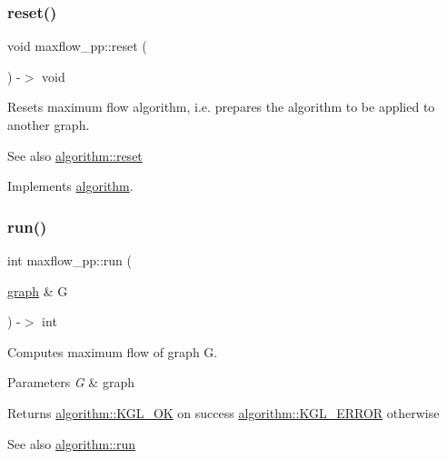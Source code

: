 \subsubsection{\texorpdfstring{reset()}{reset()}}
{\footnotesize\ttfamily void maxflow\+\_\+pp\+::reset (\begin{DoxyParamCaption}{ }\end{DoxyParamCaption}) -\/$>$ void\hspace{0.3cm}{\ttfamily [virtual]}}

Resets maximum flow algorithm, i.\+e. prepares the algorithm to be applied to another graph. \begin{DoxySeeAlso}{See also}
\mbox{\hyperlink{classalgorithm_aea645f2e39976a477c8f8564656fd1b6}{algorithm\+::reset}} 
\end{DoxySeeAlso}


Implements \mbox{\hyperlink{classalgorithm_aea645f2e39976a477c8f8564656fd1b6}{algorithm}}.

\mbox{\label{classmaxflow__pp_a6c6fa792d7f0441048361778697e8e1e}} 
\subsubsection{\texorpdfstring{run()}{run()}}
{\footnotesize\ttfamily int maxflow\+\_\+pp\+::run (\begin{DoxyParamCaption}\item[{\mbox{\hyperlink{classgraph}{graph}} \&}]{G }\end{DoxyParamCaption}) -\/$>$ int\hspace{0.3cm}{\ttfamily [virtual]}}

Computes maximum flow of graph {\ttfamily G}.


\begin{DoxyParams}{Parameters}
{\em G} & graph \\
\hline
\end{DoxyParams}
\begin{DoxyReturn}{Returns}
{\ttfamily \mbox{\hyperlink{classalgorithm_af1a0078e153aa99c24f9bdf0d97f6710aae4c1cd7fe8d8cf4b143241a6e7c31cf}{algorithm\+::\+K\+G\+L\+\_\+\+OK}}} on success {\ttfamily \mbox{\hyperlink{classalgorithm_af1a0078e153aa99c24f9bdf0d97f6710ae67bf27b2ef31f73e545a7f9f4a69556}{algorithm\+::\+K\+G\+L\+\_\+\+E\+R\+R\+OR}}} otherwise 
\end{DoxyReturn}
\begin{DoxySeeAlso}{See also}
\mbox{\hyperlink{classalgorithm_a482eb28cacba018b5a86d3a819a50a2f}{algorithm\+::run}} 
\end{DoxySeeAlso}


